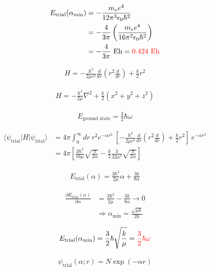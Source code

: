 \documentclass[11pt,pra,aps]{revtex4}
\newcommand{\red}[1]{\textcolor{red}{#1}}
\begin{document}
\begin{align}
  E_\text{trial}(\alpha_\text{min})&=-\frac{m_e e^4}{12 \pi^3 \epsilon_0 \hbar^2} \\
  &=-\frac{4}{3\pi}\left(\frac{m_e e^4}{16 \pi^2 \epsilon_0 \hbar^2}\right) \\
  &=-\frac{4}{3\pi}\ \text{Eh} = \red{0.424\ \text{Eh}}  
\end{align}

\begin{align}
  H=-\frac{\hbar^2}{2\mu r^2}\frac{d}{dr}\left(r^2\frac{d}{dr}\right)+\frac{k}{2}r^2
\end{align}

\begin{align}
  H=-\frac{\hbar^2}{2\mu}\nabla^2+\frac{k}{2}\left(x^2+y^2+z^2\right)
\end{align}

\begin{align}
  E_\text{ground state}=\frac{3}{2}\hbar\omega
\end{align}

\begin{align}
  \langle \psi_\text{trial}|H|\psi_\text{trial}\rangle &= 4\pi\int^{\infty}_{0} dr\ r^2 e^{-\alpha r^2}\ \left[-\frac{\hbar^2}{2\mu r^2}\frac{d}{dr}\left(r^2\frac{d}{dr}\right)+\frac{k}{2}r^2\right]\ e^{-\alpha r^2}\\
  &= 4\pi\left[ \frac{3\hbar^2}{16\mu} \sqrt{\frac{\pi}{2\alpha}}  - \frac{k}{2}\frac{3}{32\alpha^2} \sqrt{\frac{\pi}{2\alpha}} \right]
\end{align}

\begin{align}
  E_\text{trial}(\alpha)=\frac{3\hbar^2}{2\mu}\alpha + \frac{3k}{8\alpha}
\end{align}

\begin{align}
  \frac{\partial E_\text{trial}(\alpha)}{\partial \alpha}&=\frac{3\hbar^2}{2\mu} - \frac{3k}{8\alpha}\rightarrow 0 \\
  &\Rightarrow \alpha_\text{min} = \frac{\sqrt{\mu k}}{2\hbar}
\end{align}

\begin{align}
  E_\text{trial}(\alpha_\text{min})=\frac{3}{2}\hbar\sqrt{\frac{k}{\mu}}=\red{\frac{3}{2}\hbar\omega}
\end{align}

\begin{align}
  \psi_\text{trial}(\alpha;r)=N\exp\left(-\alpha r\right)
\end{align}
\end{document}
